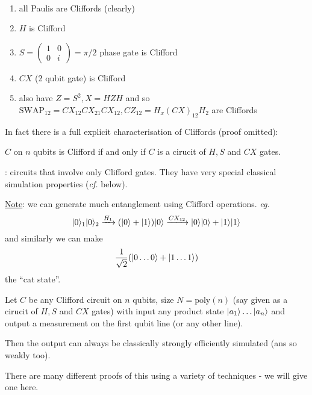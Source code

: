 \documentclass[]{article}
\renewcommand{\it}[1]{\textit{#1}}
\newcommand{\poly}{\textrm{poly}}
\begin{document}
\begin{remark*}[Examples]\ 
	\begin{enumerate}
		\item all Paulis are Cliffords (clearly)
		\item $H$ is Clifford
		\item $S = \left(\begin{array}{cc} 1 & 0\\ 0 & i\end{array}\right) = \pi/2$ phase gate is Clifford
		\item $CX$ (2 qubit gate) is Clifford
		\item also have $Z = S^2, X = HZH$ and so $\textrm{SWAP}_{12} = CX_{12}CX_{21}CX_{12}, CZ_{12} = H_x(CX)_{12}H_2$ are Cliffords
	\end{enumerate}
\end{remark*}

In fact there is a full explicit characterisation of Cliffords (proof omitted):

\begin{theorem*}
	$C$ on $n$ qubits is Clifford if and only if $C$ is a cirucit of $H,S$ and $CX$ gates.
\end{theorem*}

: circuits that involve only Clifford gates. They have very special classical simulation properties (\it{cf.} below).

\underline{Note}: we can generate much entanglement using Clifford operations. \it{eg.} $$\lvert0\rangle_1\lvert0\rangle_2 \xrightarrow{H_1} (\lvert0\rangle + \lvert1\rangle)\lvert0\rangle \xrightarrow{CX_{12}}\lvert0\rangle\lvert0\rangle + \lvert1\rangle\lvert1\rangle$$ and similarly we can make $$\frac{1}{\sqrt{2}}(\lvert0\dots 0\rangle + \lvert1\dots 1\rangle)$$ the ``cat state''.

\begin{theorem*}
	Let $C$ be any Clifford circuit on $n$ qubits, size $N = \poly(n)$ (say given as a cirucit of $H,S$ and $CX$ gates) with input any product state $\lvert a_1\rangle\dots\lvert a_n\rangle$ and output a measurement on the first qubit line (or any other line).

	Then the output can always be classically strongly efficiently simulated (ans so weakly too).
\end{theorem*}

There are many different proofs of this using a variety of techniques - we will give one here.
\end{document}
